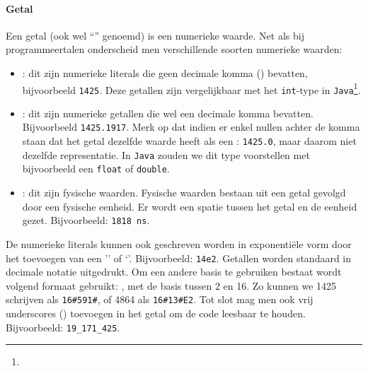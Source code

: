 \paragraph{Getal}Een getal (ook wel ``'' genoemd) is een numerieke waarde. Net als bij programmeertalen onderscheid men verschillende soorten numerieke waarden:
\begin{itemize}
  \item {}: dit zijn numerieke literals die geen decimale komma () bevatten, bijvoorbeeld \verb+1425+. Deze getallen zijn vergelijkbaar met het \texttt{int}-type in \texttt{Java}\footnote{}.
  \item {}: dit zijn numerieke getallen die wel een decimale komma bevatten. Bijvoorbeeld \verb+1425.1917+. Merk op dat indien er enkel nullen achter de komma staan dat het getal dezelfde waarde heeft als een : \verb+1425.0+, maar daarom niet dezelfde representatie. In \texttt{Java} zouden we dit type voorstellen met bijvoorbeeld een \texttt{float} of \texttt{double}.
  \item {}: dit zijn fysische waarden. Fysische waarden bestaan uit een getal gevolgd door een fysische eenheid. Er wordt een spatie tussen het getal en de eenheid gezet. Bijvoorbeeld: \verb+1818 ns+.
\end{itemize}
De numerieke literals kunnen ook geschreven worden in exponenti\"ele vorm door het toevoegen van een '' of `'. Bijvoorbeeld: \verb+14e2+. Getallen worden standaard in decimale notatie uitgedrukt. Om een andere basis te gebruiken bestaat wordt volgend formaat gebruikt: , met de basis tussen 2 en 16. Zo kunnen we 1425 schrijven als \verb+16#591#+, of 4864 als \verb+16#13#E2+. Tot slot mag men ook vrij underscores (\vhdltermen{\_}) toevoegen in het getal om de code leesbaar te houden. Bijvoorbeeld: \verb+19_171_425+.
